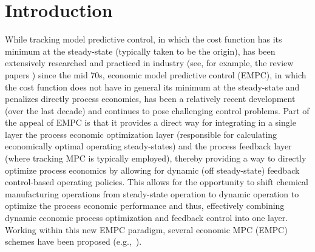 \documentclass[letterpaper, 10pt, conference]{ieeeconf}
\begin{document}
	\section{Introduction}
	While tracking model predictive control, in which the cost function has
	its minimum at the steady-state (typically taken to be
	the origin), has been extensively researched and practiced in industry
	(see, for example, the review papers \cite{Garcia1989335, Mayne2000789,
		Qin2003733}) since the mid 70s, economic model predictive
	control (EMPC), in which the cost function does not have in general its
	minimum at the steady-state and penalizes directly process
	economics, has been a relatively recent development (over the last decade)
	and continues to pose challenging control problems.
	Part of the appeal of EMPC is that it provides a direct way for
	integrating in a single layer the process economic optimization layer
	(responsible for calculating economically optimal operating steady-states)
	and the process feedback layer (where tracking MPC is typically
	employed), thereby providing a way to directly optimize process economics
	by allowing for dynamic (off steady-state) feedback control-based
	operating policies. This allows for the opportunity to shift chemical
	manufacturing operations from steady-state operation to dynamic operation
	to optimize the process economic performance and thus, effectively
	combining dynamic economic process optimization and feedback control into
	one layer. Working within this new EMPC paradigm, several economic MPC
	(EMPC) schemes have been proposed (e.g.,~\cite{Amrit2011178, Diehl2011703,
		Huang2011501, Angeli20121615, Heidarinejad2012855, Rawlings20123851}).
	
\end{document}
